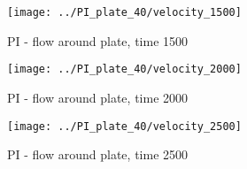 \begin{figure}[htbp]
 \centering 
 \texttt{[image: ../PI\_plate\_40/velocity\_1500]}
 \label{transitions}
 \caption{PI - flow around plate, time 1500}
\end{figure}

\begin{figure}[htbp]
 \centering 
 \texttt{[image: ../PI\_plate\_40/velocity\_2000]}
 \caption{PI - flow around plate, time 2000}
\end{figure}

\begin{figure}[htbp]
 \centering 
 \texttt{[image: ../PI\_plate\_40/velocity\_2500]}
 \caption{PI - flow around plate, time 2500}
\end{figure}
